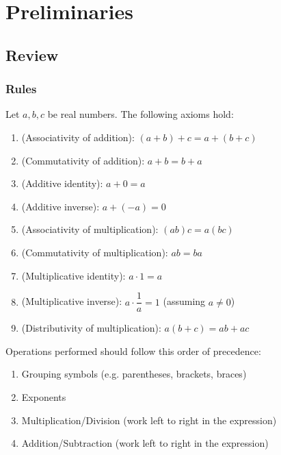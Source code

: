 \documentclass[notes]{subfiles}
\begin{document}
	\setcounter{chapter}{-1}
	\chapter{Preliminaries}
	\setcounter{section}{0}
	\setcounter{page}{1}
	\fancyhead[LO,RE]{\bfseries \currentname}
	\fancyfoot[C]{{}}
	\fancyfoot[LO,RE]{\large \thepage}	%

\section*{Review}\label{csr}
	
	\subsection*{Rules}
		\begin{rmk}
			Let \(a,b,c\) be real numbers. The following axioms hold:
			\begin{enumerate}
				\item (Associativity of addition): \((a + b) + c = a + (b+c)\)
				\item (Commutativity of addition): \(a + b = b + a\)
				\item (Additive identity): \(a + 0 = a\)
				\item (Additive inverse): \(a + (-a) = 0\)
				\item (Associativity of multiplication): \((ab)c = a(bc)\)
				\item (Commutativity of multiplication): \(ab = ba\)
				\item (Multiplicative identity): \(a\cdot 1 = a\)
				\item (Multiplicative inverse): \(a \cdot \dfrac{1}{a} = 1\) (assuming \(a\neq 0\))
				\item (Distributivity of multiplication): \(a(b + c) = ab + ac\)
			\end{enumerate}
		\end{rmk}
		
		\begin{rmk}
			Operations performed should follow this order of precedence:
			\begin{enumerate}
				\item Grouping symbols (e.g. parentheses, brackets, braces)
				\item Exponents
				\item Multiplication/Division (work left to right in the expression)
				\item Addition/Subtraction (work left to right in the expression)
			\end{enumerate}
		\end{rmk}
		
\end{document}
